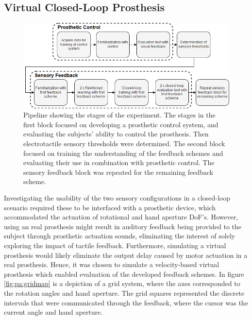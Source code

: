 
\subsection{Virtual Closed-Loop Prosthesis}
 \begin{figure}[h]
		\includegraphics[width=.85\textwidth]{figures/std_paper}
	\caption{Pipeline showing the stages of the experiment. The stages in the first block focused on developing a prosthetic control system, and evaluating the subjects' ability to control the prosthesis. Then electrotactile sensory thresholds were determined. The second block focused on training the understanding of the feedback schemes and evaluating their use in combination with prosthetic control. The sensory feedback block was repeated for the remaining feedback scheme.}
	\label{fig:pa:std_pap} 
\end{figure}
Investigating the usability of the two sensory configurations in a closed-loop scenario required these to be interfaced with a prosthetic device, which accommodated the actuation of rotational and hand aperture DoF's. However, using an real prosthesis might result in auditory feedback being provided to the subject through prosthetic actuation sounds, eliminating the interest of solely exploring the impact of tactile feedback. Furthermore, simulating a virtual prosthesis would likely eliminate the output delay caused by motor actuation in a real prosthesis. Hence, it was chosen to simulate a velocity-based virtual prosthesis which enabled evaluation of the developed feedback schemes. In figure \ref{fig:pa:gridmap} is a depiction of a grid system, where the axes corresponded to the rotation angles and hand aperture. The grid squares represented the discrete intervals that were communicated through the feedback, where the cursor was the current angle and hand aperture. 
